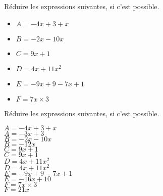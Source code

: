 \begin{exercice*}
    Réduire les expressions suivantes, si c'est possible.
    \begin{multicols}{2}
        \begin{itemize}
            \item[] $A=-4x+3+x$
            \item[] $B=-2x-10x$
            \item[] $C=9x+1$
            \item[] $D=4x+11x^2$
            \item[] $E=-9x+9-7x+1$
            \item[] $F=7x\times 3$
        \end{itemize}
    \end{multicols}
\end{exercice*}
\begin{corrige}
    Réduire les expressions suivantes, si c'est possible.
    \begin{multicols}{2}
        \begin{itemize}
            \def\item{}
            \item $A=-4x+3+x$\\
            {\red $A=-3x+3$}\\\smallskip
            \item $B=-2x-10x$\\
            {\red $B=-12x$}\\\smallskip
            \item $C=9x+1$\\
            {\red $C=9x+1$}\\\smallskip
            \item $D=4x+11x^2$\\
            {\red $D=4x+11x^2$}\\\smallskip
            \item $E=-9x+9-7x+1$\\
            {\red $E=-16x+10$}\\\smallskip
            \item $F=7x\times 3$\\
            {\red $F=21x$}
        \end{itemize}
    \end{multicols}
\end{corrige}

